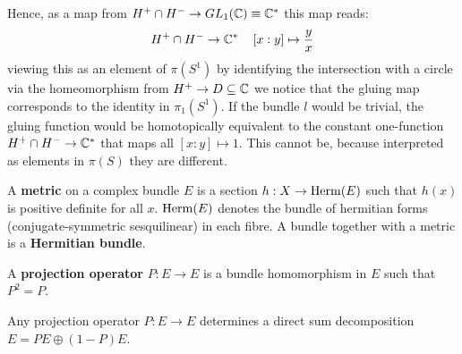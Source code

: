 \begin{example}
\begin{equation*}
\end{equation*}
Hence, as a map from $H^+\cap H^-\to GL_1(\mathbb{C})\equiv \mathbb{C}^*$ this map reads:
\begin{equation*}
	H^+\cap H^-\to \mathbb{C}^*\,\quad [x:y]\mapsto \frac{y}{x}
\end{equation*} viewing this as an element of $\pi(S^1)$ by identifying the intersection with a circle via the homeomorphism from $H^+\to D\subseteq \mathbb{C}$ we notice that the gluing map corresponds to the identity in $\pi_1(S^1)$. If the bundle $l$ would be trivial, the gluing function would be homotopically equivalent to the constant one-function $H^+\cap H^-\to \mathbb{C}^*$ that maps all $[x:y]\mapsto 1$. This cannot be, because interpreted as elements in $\pi(S)$ they are different.
\end{example}
\begin{definition}\label{def:kTheo-metricsOnBundles}
	A \textbf{metric} on a complex bundle $E$ is a section $h:X\to \operatorname{\mathrm{Herm}}(E)$ such that $h(x)$ is positive definite for all $x$. $\operatorname{\mathrm{Herm}}(E)$ denotes the bundle of hermitian forms (conjugate-symmetric sesquilinear) in each fibre. A bundle together with a metric is a \textbf{Hermitian bundle}.
\end{definition}
\begin{definition}\label{def:kTheo-projectionOperator}
	A \textbf{projection operator} $P: E\to E$ is a bundle homomorphism in $E$ such that $P^2=P$. 
\end{definition}
\begin{lemma}\label{lem:kTheo-projectionsGiveSumdecomposition}
	Any projection operator $P:E\to E$ determines a direct sum decomposition $E=PE\oplus (1-P)E$.
\end{lemma}




